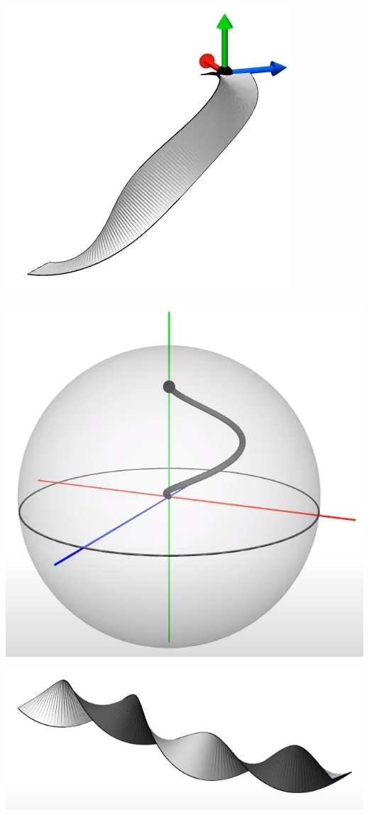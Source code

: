 \documentclass[10pt]{beamer}
\begin{document}
\begin{frame}
    \includegraphics[scale=0.1]{Pictures/noncontractiblepathbelt.png}

    \includegraphics[scale=0.1]{Pictures/noncontractiblepathsphere.png}

    \includegraphics[scale=0.1]{Pictures/4pibelt.png}


\end{frame}
\end{document}
